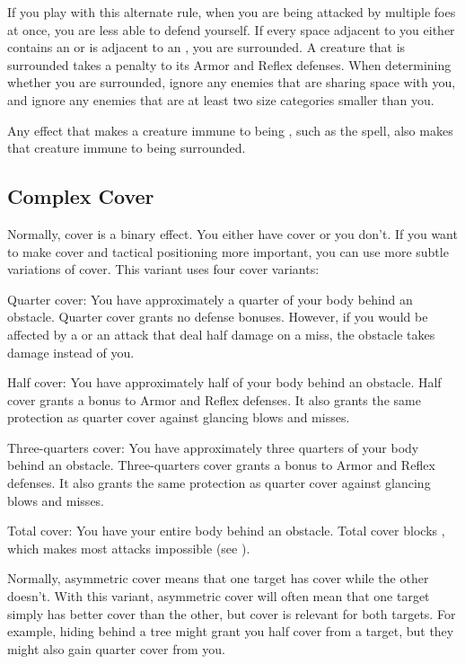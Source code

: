     If you play with this alternate rule, when you are being attacked by multiple foes at once, you are less able to defend yourself.
    If every space adjacent to you either contains an  or is adjacent to an , you are surrounded.
    A creature that is surrounded takes a  penalty to its Armor and Reflex defenses.
    When determining whether you are surrounded, ignore any enemies that are sharing space with you, and ignore any enemies that are at least two size categories smaller than you.

    Any effect that makes a creature immune to being \partiallyunaware, such as the  spell, also makes that creature immune to being surrounded.

  \subsection{Complex Cover}
    Normally, cover is a binary effect.
    You either have cover or you don't.
    If you want to make cover and tactical positioning more important, you can use more subtle variations of cover.
    This variant uses four cover variants:
    \begin{raggeditemize}
      \item Quarter cover: You have approximately a quarter of your body behind an obstacle.
        Quarter cover grants no defense bonuses.
        However, if you would be affected by a  or an attack that deal half damage on a miss, the obstacle takes damage instead of you.
      \item Half cover: You have approximately half of your body behind an obstacle.
        Half cover grants a  bonus to Armor and Reflex defenses.
        It also grants the same protection as quarter cover against glancing blows and misses.
      \item Three-quarters cover: You have approximately three quarters of your body behind an obstacle.
        Three-quarters cover grants a  bonus to Armor and Reflex defenses.
        It also grants the same protection as quarter cover against glancing blows and misses.
      \item Total cover: You have your entire body behind an obstacle.
        Total cover blocks , which makes most attacks impossible (see ).
    \end{raggeditemize}

    Normally, asymmetric cover means that one target has cover while the other doesn't.
    With this variant, asymmetric cover will often mean that one target simply has better cover than the other, but cover is relevant for both targets.
    For example, hiding behind a tree might grant you half cover from a target, but they might also gain quarter cover from you.

